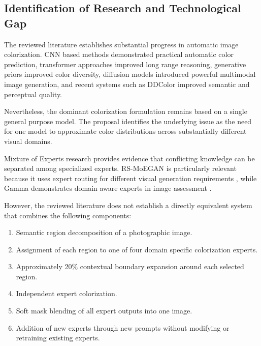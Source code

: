 \documentclass{FastFyp}
\begin{document}
\subsection{Identification of Research and Technological Gap}

The reviewed literature establishes substantial progress in automatic image colorization. CNN based methods demonstrated practical automatic color prediction, transformer approaches improved long range reasoning, generative priors improved color diversity, diffusion models introduced powerful multimodal image generation, and recent systems such as DDColor improved semantic and perceptual quality.

Nevertheless, the dominant colorization formulation remains based on a single general purpose model. The proposal identifies the underlying issue as the need for one model to approximate color distributions across substantially different visual domains.

Mixture of Experts research provides evidence that conflicting knowledge can be separated among specialized experts. RS-MoEGAN is particularly relevant because it uses expert routing for different visual generation requirements \cite{ref16}, while Gamma demonstrates domain aware experts in image assessment \cite{ref15}.

However, the reviewed literature does not establish a directly equivalent system that combines the following components:

\begin{enumerate}
    \item Semantic region decomposition of a photographic image.
    
    \item Assignment of each region to one of four domain specific colorization experts.
    
    \item Approximately 20\% contextual boundary expansion around each selected region.
    
    \item Independent expert colorization.
    
    \item Soft mask blending of all expert outputs into one image.
    
    \item Addition of new experts through new prompts without modifying or retraining existing experts.
\end{enumerate}
\end{document}
